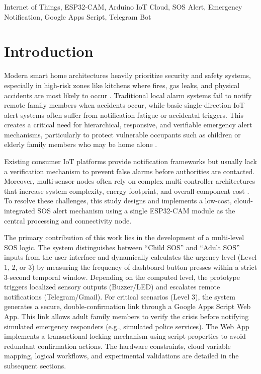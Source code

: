 \documentclass[conference]{IEEEtran}
\begin{document}
\begin{IEEEkeywords}
Internet of Things, ESP32-CAM, Arduino IoT Cloud, SOS Alert, Emergency Notification, Google Apps Script, Telegram Bot
\end{IEEEkeywords}

\section{Introduction}
Modern smart home architectures heavily prioritize security and safety systems, especially in high-risk zones like kitchens where fires, gas leaks, and physical accidents are most likely to occur \cite{malche2017internet}. Traditional local alarm systems fail to notify remote family members when accidents occur, while basic single-direction IoT alert systems often suffer from notification fatigue or accidental triggers. This creates a critical need for hierarchical, responsive, and verifiable emergency alert mechanisms, particularly to protect vulnerable occupants such as children or elderly family members who may be home alone \cite{taiwo2021internet}.

Existing consumer IoT platforms provide notification frameworks but usually lack a verification mechanism to prevent false alarms before authorities are contacted. Moreover, multi-sensor nodes often rely on complex multi-controller architectures that increase system complexity, energy footprint, and overall component cost \cite{stojkoska2017review}. To resolve these challenges, this study designs and implements a low-cost, cloud-integrated SOS alert mechanism using a single ESP32-CAM module as the central processing and connectivity node.

The primary contribution of this work lies in the development of a multi-level SOS logic. The system distinguishes between ``Child SOS'' and ``Adult SOS'' inputs from the user interface and dynamically calculates the urgency level (Level 1, 2, or 3) by measuring the frequency of dashboard button presses within a strict 3-second temporal window. Depending on the computed level, the prototype triggers localized sensory outputs (Buzzer/LED) and escalates remote notifications (Telegram/Gmail). For critical scenarios (Level 3), the system generates a secure, double-confirmation link through a Google Apps Script Web App. This link allows adult family members to verify the crisis before notifying simulated emergency responders (e.g., simulated police services). The Web App implements a transactional locking mechanism using script properties to avoid redundant confirmation actions. The hardware constraints, cloud variable mapping, logical workflows, and experimental validations are detailed in the subsequent sections.
\end{document}
